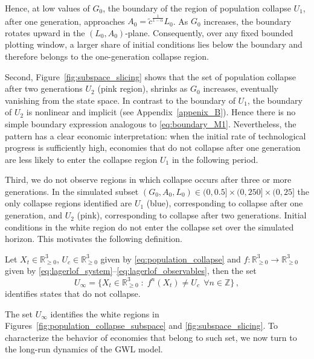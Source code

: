 \documentclass[a4paper,fleqn]{cas-sc}
\begin{document}
%
Hence, at low values of $G_0$, the boundary of the region of population collapse $U_1$, after one generation, approaches $A_0=\tilde{c}^{\frac{1}{1-\alpha}}L_0$.
As $G_0$ increases, the boundary rotates upward in the $(L_0,A_0)$-plane. Consequently, over any fixed bounded plotting window, a larger share of initial conditions lies below the boundary and therefore belongs to the one-generation collapse region.

Second, Figure~\ref{fig:subspace_slicing} shows that the set of population collapse after two generations $U_2$ (pink region), shrinks as $G_0$ increases, eventually vanishing from the state space. 
In contrast to the boundary of $U_1$, the boundary of $U_2$ is nonlinear and implicit (see Appendix~\ref{appenix_B}). Hence there is no simple boundary expression analogous to \eqref{eq:boundary_M1}. 
Nevertheless, the pattern has a clear economic interpretation: when the initial rate of technological progress is sufficiently high, economies that do not collapse after one generation are less likely to enter the collapse region $U_1$ in the following period.

Third, we do not observe regions in which collapse occurs after three or more generations. In the simulated subset $ (G_0,A_0,L_0)\in(0,0.5]\times(0,250]\times(0,25]$ the only collapse regions identified are $U_1$ (blue), corresponding to collapse after one generation, and $U_2$ (pink), corresponding to collapse after two generations. 
Initial conditions in the white region do not enter the collapse set over the simulated horizon. This motivates the following definition.
%
\begin{definition}\label{def:set_population_survival}
     Let $X_t\in \mathbb{R}^3_{\geq0}$, $U_c\in \mathbb{R}^3_{\geq0}$ given by \eqref{eq:population_collapse} and $f:\mathbb{R}^3_{\geq0}\to \mathbb{R}^3_{\geq0}$ given by \eqref{eq:lagerlof_system}--\eqref{eq:lagerlof_observables}, then the set
     \begin{equation}\label{eq:set_population_survival}
         U_{\infty} = \{X_t\in \mathbb{R}^3_{\geq0} \;:\; f^{n}(X_t)\neq U_c\,\;\forall n\in\mathbb{Z}\}\,,
     \end{equation}
     identifies states that do not collapse.
\end{definition}
%
The set $U_{\infty}$ identifies the white regions in Figures~\ref{fig:population_collapse_subspace} and \ref{fig:subspace_slicing}. 
To characterize the behavior of economies that belong to such set, we now turn to the long-run dynamics of the GWL model.
\end{document}
